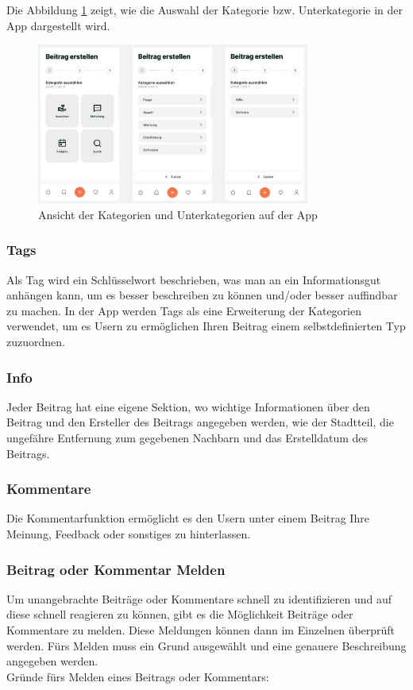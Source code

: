 Die Abbildung \ref{fig:categories} zeigt, wie die Auswahl der Kategorie bzw. Unterkategorie in der App dargestellt wird.

\begin{figure}[H]
  \centering
  \includegraphics[width=0.8\textwidth]{pics/categories.JPG}
  \caption{Ansicht der Kategorien und Unterkategorien auf der App}
  \label{fig:categories}
\end{figure}


\subsubsection{Tags}
Als Tag wird ein Schlüsselwort beschrieben, was man an ein Informationsgut anhängen kann, um es besser beschreiben zu können und/oder besser auffindbar zu machen. In der App werden Tags als eine Erweiterung der Kategorien verwendet, um es Usern zu ermöglichen Ihren Beitrag einem selbstdefinierten Typ zuzuordnen.

\subsubsection{Info}
Jeder Beitrag hat eine eigene Sektion, wo wichtige Informationen über den Beitrag und den Ersteller des Beitrags angegeben werden, wie der Stadtteil, die ungefähre Entfernung zum gegebenen Nachbarn und das Erstelldatum des Beitrags.

\subsubsection{Kommentare}
Die Kommentarfunktion ermöglicht es den Usern unter einem Beitrag Ihre Meinung, Feedback oder sonstiges zu hinterlassen.

\subsubsection{Beitrag oder Kommentar Melden}
Um unangebrachte Beiträge oder Kommentare schnell zu identifizieren und auf diese schnell reagieren zu können, gibt es die Möglichkeit Beiträge oder Kommentare zu melden. Diese Meldungen können dann im Einzelnen überprüft werden. Fürs Melden muss ein Grund ausgewählt und eine genauere Beschreibung angegeben werden.
\\
Gründe fürs Melden eines Beitrags oder Kommentars:

